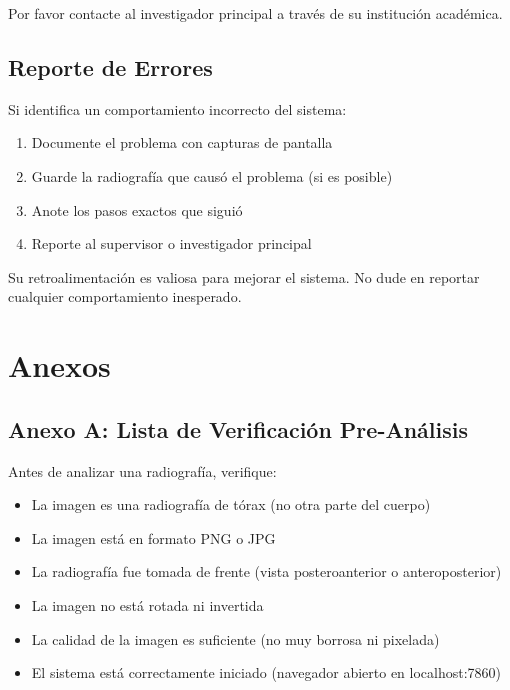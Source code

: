 \documentclass[12pt,a4paper]{article}
\newcommand{\nota}[1]{%
    \begin{tcolorbox}[colback=blue!5!white,colframe=primaryblue,title=Nota]
        #1
    \end{tcolorbox}
}
\begin{document}
Por favor contacte al investigador principal a través de su institución académica.

\subsection{Reporte de Errores}

Si identifica un comportamiento incorrecto del sistema:
\begin{enumerate}[leftmargin=*]
    \item Documente el problema con capturas de pantalla
    \item Guarde la radiografía que causó el problema (si es posible)
    \item Anote los pasos exactos que siguió
    \item Reporte al supervisor o investigador principal
\end{enumerate}

\nota{
Su retroalimentación es valiosa para mejorar el sistema. No dude en reportar cualquier comportamiento inesperado.
}

\newpage

\section{Anexos}

\subsection{Anexo A: Lista de Verificación Pre-Análisis}

Antes de analizar una radiografía, verifique:

\begin{itemize}[itemsep=3pt]
    \item[$\square$] La imagen es una radiografía de tórax (no otra parte del cuerpo)
    \item[$\square$] La imagen está en formato PNG o JPG
    \item[$\square$] La radiografía fue tomada de frente (vista posteroanterior o anteroposterior)
    \item[$\square$] La imagen no está rotada ni invertida
    \item[$\square$] La calidad de la imagen es suficiente (no muy borrosa ni pixelada)
    \item[$\square$] El sistema está correctamente iniciado (navegador abierto en localhost:7860)
\end{itemize}
\end{document}
